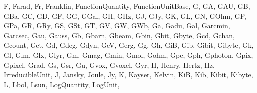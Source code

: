 \documentclass[letterpaper,10pt,english]{sphinxmanual}
\begin{document}
\begin{sphinxVerbatim}[commandchars=\\\{\}]
 \PYGZsq{}F\PYGZsq{},
 \PYGZsq{}Farad\PYGZsq{},
 \PYGZsq{}Fr\PYGZsq{},
 \PYGZsq{}Franklin\PYGZsq{},
 \PYGZsq{}FunctionQuantity\PYGZsq{},
 \PYGZsq{}FunctionUnitBase\PYGZsq{},
 \PYGZsq{}G\PYGZsq{},
 \PYGZsq{}GA\PYGZsq{},
 \PYGZsq{}GAU\PYGZsq{},
 \PYGZsq{}GB\PYGZsq{},
 \PYGZsq{}GBa\PYGZsq{},
 \PYGZsq{}GC\PYGZsq{},
 \PYGZsq{}GD\PYGZsq{},
 \PYGZsq{}GF\PYGZsq{},
 \PYGZsq{}GG\PYGZsq{},
 \PYGZsq{}GGal\PYGZsq{},
 \PYGZsq{}GH\PYGZsq{},
 \PYGZsq{}GHz\PYGZsq{},
 \PYGZsq{}GJ\PYGZsq{},
 \PYGZsq{}GJy\PYGZsq{},
 \PYGZsq{}GK\PYGZsq{},
 \PYGZsq{}GL\PYGZsq{},
 \PYGZsq{}GN\PYGZsq{},
 \PYGZsq{}GOhm\PYGZsq{},
 \PYGZsq{}GP\PYGZsq{},
 \PYGZsq{}GPa\PYGZsq{},
 \PYGZsq{}GR\PYGZsq{},
 \PYGZsq{}GRy\PYGZsq{},
 \PYGZsq{}GS\PYGZsq{},
 \PYGZsq{}GSt\PYGZsq{},
 \PYGZsq{}GT\PYGZsq{},
 \PYGZsq{}GV\PYGZsq{},
 \PYGZsq{}GW\PYGZsq{},
 \PYGZsq{}GWb\PYGZsq{},
 \PYGZsq{}Ga\PYGZsq{},
 \PYGZsq{}Gadu\PYGZsq{},
 \PYGZsq{}Gal\PYGZsq{},
 \PYGZsq{}Garcmin\PYGZsq{},
 \PYGZsq{}Garcsec\PYGZsq{},
 \PYGZsq{}Gau\PYGZsq{},
 \PYGZsq{}Gauss\PYGZsq{},
 \PYGZsq{}Gb\PYGZsq{},
 \PYGZsq{}Gbarn\PYGZsq{},
 \PYGZsq{}Gbeam\PYGZsq{},
 \PYGZsq{}Gbin\PYGZsq{},
 \PYGZsq{}Gbit\PYGZsq{},
 \PYGZsq{}Gbyte\PYGZsq{},
 \PYGZsq{}Gcd\PYGZsq{},
 \PYGZsq{}Gchan\PYGZsq{},
 \PYGZsq{}Gcount\PYGZsq{},
 \PYGZsq{}Gct\PYGZsq{},
 \PYGZsq{}Gd\PYGZsq{},
 \PYGZsq{}Gdeg\PYGZsq{},
 \PYGZsq{}Gdyn\PYGZsq{},
 \PYGZsq{}GeV\PYGZsq{},
 \PYGZsq{}Gerg\PYGZsq{},
 \PYGZsq{}Gg\PYGZsq{},
 \PYGZsq{}Gh\PYGZsq{},
 \PYGZsq{}GiB\PYGZsq{},
 \PYGZsq{}Gib\PYGZsq{},
 \PYGZsq{}Gibit\PYGZsq{},
 \PYGZsq{}Gibyte\PYGZsq{},
 \PYGZsq{}Gk\PYGZsq{},
 \PYGZsq{}Gl\PYGZsq{},
 \PYGZsq{}Glm\PYGZsq{},
 \PYGZsq{}Glx\PYGZsq{},
 \PYGZsq{}Glyr\PYGZsq{},
 \PYGZsq{}Gm\PYGZsq{},
 \PYGZsq{}Gmag\PYGZsq{},
 \PYGZsq{}Gmin\PYGZsq{},
 \PYGZsq{}Gmol\PYGZsq{},
 \PYGZsq{}Gohm\PYGZsq{},
 \PYGZsq{}Gpc\PYGZsq{},
 \PYGZsq{}Gph\PYGZsq{},
 \PYGZsq{}Gphoton\PYGZsq{},
 \PYGZsq{}Gpix\PYGZsq{},
 \PYGZsq{}Gpixel\PYGZsq{},
 \PYGZsq{}Grad\PYGZsq{},
 \PYGZsq{}Gs\PYGZsq{},
 \PYGZsq{}Gsr\PYGZsq{},
 \PYGZsq{}Gu\PYGZsq{},
 \PYGZsq{}Gvox\PYGZsq{},
 \PYGZsq{}Gvoxel\PYGZsq{},
 \PYGZsq{}Gyr\PYGZsq{},
 \PYGZsq{}H\PYGZsq{},
 \PYGZsq{}Henry\PYGZsq{},
 \PYGZsq{}Hertz\PYGZsq{},
 \PYGZsq{}Hz\PYGZsq{},
 \PYGZsq{}IrreducibleUnit\PYGZsq{},
 \PYGZsq{}J\PYGZsq{},
 \PYGZsq{}Jansky\PYGZsq{},
 \PYGZsq{}Joule\PYGZsq{},
 \PYGZsq{}Jy\PYGZsq{},
 \PYGZsq{}K\PYGZsq{},
 \PYGZsq{}Kayser\PYGZsq{},
 \PYGZsq{}Kelvin\PYGZsq{},
 \PYGZsq{}KiB\PYGZsq{},
 \PYGZsq{}Kib\PYGZsq{},
 \PYGZsq{}Kibit\PYGZsq{},
 \PYGZsq{}Kibyte\PYGZsq{},
 \PYGZsq{}L\PYGZsq{},
 \PYGZsq{}L\PYGZus{}bol\PYGZsq{},
 \PYGZsq{}L\PYGZus{}sun\PYGZsq{},
 \PYGZsq{}LogQuantity\PYGZsq{},
 \PYGZsq{}LogUnit\PYGZsq{},

\end{sphinxVerbatim}
\end{document}
